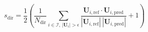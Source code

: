 \documentclass[12pt]{article}
\begin{document}
\begin{equation*}
s_{\text{dir}} = \frac{1}{2}\!\left(\frac{1}{N_{\text{dir}}} \sum_{i \in \mathcal{I},\, |\mathbf{U}_i| > \epsilon} \frac{\mathbf{U}_{i,\text{ref}} \cdot \mathbf{U}_{i,\text{pred}}}{|\mathbf{U}_{i,\text{ref}}|\,|\mathbf{U}_{i,\text{pred}}|} + 1\right)
\end{equation*}
\end{document}
